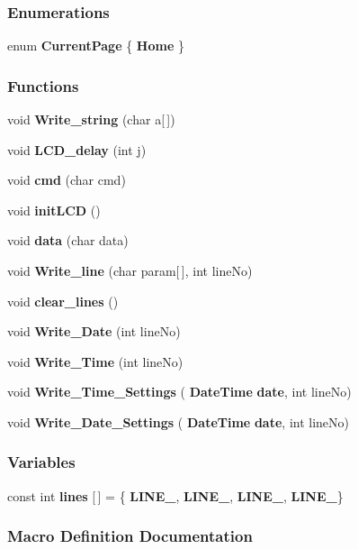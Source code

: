 \subsubsection*{Enumerations}
\begin{DoxyCompactItemize}
\item 
enum \textbf{ Current\+Page} \{ \textbf{ Home}
 \}
\end{DoxyCompactItemize}
\subsubsection*{Functions}
\begin{DoxyCompactItemize}
\item 
void \textbf{ Write\+\_\+string} (char a[$\,$])
\item 
void \textbf{ L\+C\+D\+\_\+delay} (int j)
\item 
void \textbf{ cmd} (char cmd)
\item 
void \textbf{ init\+L\+CD} ()
\item 
void \textbf{ data} (char data)
\item 
void \textbf{ Write\+\_\+line} (char param[$\,$], int line\+No)
\item 
void \textbf{ clear\+\_\+lines} ()
\item 
void \textbf{ Write\+\_\+\+Date} (int line\+No)
\item 
void \textbf{ Write\+\_\+\+Time} (int line\+No)
\item 
void \textbf{ Write\+\_\+\+Time\+\_\+\+Settings} (\textbf{ Date\+Time} \textbf{ date}, int line\+No)
\item 
void \textbf{ Write\+\_\+\+Date\+\_\+\+Settings} (\textbf{ Date\+Time} \textbf{ date}, int line\+No)
\end{DoxyCompactItemize}
\subsubsection*{Variables}
\begin{DoxyCompactItemize}
\item 
const int \textbf{ lines} [$\,$] = \{\textbf{ L\+I\+N\+E\+\_}, \textbf{ L\+I\+N\+E\+\_}, \textbf{ L\+I\+N\+E\+\_}, \textbf{ L\+I\+N\+E\+\_}\}
\end{DoxyCompactItemize}


\subsubsection{Macro Definition Documentation}
\mbox{\label{a00032_abc1d11a56e6a6edad1ac6c0a90a807b3}} 
